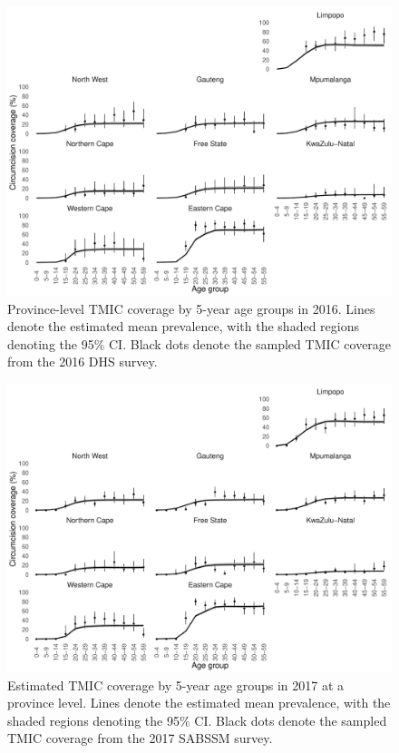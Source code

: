 \documentclass{article}
\begin{document}
\begin{appendix}

\begin{figure}[H]
	\centering
	\includegraphics[width = \linewidth]{Figures/suppmat/ModelFit/TMICPrev_5year_Province_2016_withsurveypoints}
	\caption{Province-level TMIC coverage by 5-year age groups in 2016. Lines denote the estimated mean prevalence, with the shaded regions denoting the 95\% CI. Black dots denote the sampled TMIC coverage from the 2016 DHS survey.}
\end{figure}


\begin{figure}[H]
	\centering
	\includegraphics[width = \linewidth]{Figures/suppmat/ModelFit/TMICPrev_5year_Province_2017_withsurveypoints}
	\caption{Estimated TMIC coverage by 5-year age groups in 2017 at a province level. Lines denote the estimated mean prevalence, with the shaded regions denoting the 95\% CI. Black dots denote the sampled TMIC coverage from the 2017 SABSSM survey.}
\end{figure}


\end{appendix}
\end{document}
